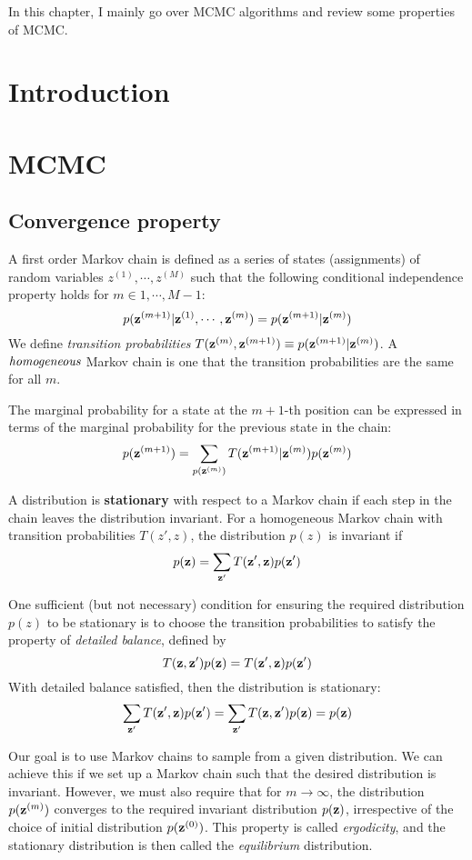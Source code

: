 In this chapter, I mainly go over MCMC algorithms and review some properties of MCMC.
\section{Introduction}
\section{MCMC}
\subsection{Convergence property}
A first order Markov chain is defined as a series of states (assignments) of random variables $z^{(1)},\cdots,z^{(M)}$ such that the following conditional independence property holds for $m \in {1,\cdots,M-1}$:
$$p({\bf z}^{(m+1)}|{\bf z}^{(1)}, \cdots, {\bf z}^{(m)})=p({\bf z}^{(m+1)}|{\bf z}^{(m)})$$
We define {\it transition probabilities} $T({\bf z}^{(m)},{\bf z}^{(m+1)})\equiv p({\bf z}^{(m+1)}|{\bf z}^{(m)})$. A ${\it homogeneous}$ Markov chain is one that
the transition probabilities are the same for all $m$.


The marginal probability for a state at the $m+1$-th position can be expressed in terms of the marginal probability for the previous state in the chain:
$$p({\bf z}^{(m+1)})=\sum_{p({\bf z}^{(m)})} T({\bf z}^{(m+1)}|{\bf z}^{(m)})p({\bf z}^{(m)})$$

A distribution is {\bf stationary} with respect to a Markov chain if each step in the chain leaves the distribution invariant. For a homogeneous Markov chain 
with transition probabilities $T(z',z)$, the distribution $p(z)$ is invariant if
$$p({\bf z}) = \sum_{{\bf z'}}T({\bf z'}, {\bf z})p({\bf z'})$$

One sufficient (but not necessary) condition for ensuring the required distribution $p(z)$ to be stationary is to choose the transition probabilities to satisfy the property
of {\it detailed balance}, defined by
$$T({\bf z}, {\bf z'})p({\bf z}) = T({\bf z'}, {\bf z})p({\bf z'})$$
With detailed balance satisfied, then the distribution is stationary:
$$\sum_{{\bf z'}}T({\bf z'}, {\bf z})p({\bf z'}) = \sum_{{\bf z'}}T({\bf z}, {\bf z'})p({\bf z}) = p({\bf z})$$

Our goal is to use Markov chains to sample from a given distribution. We can achieve this if we set up a Markov chain such that the desired distribution is invariant. However, we must also require that for $m \rightarrow \infty$, the distribution $p({\bf z}^{(m)})$ converges to the required invariant distribution $p({\bf z})$, irrespective of the choice of initial distribution $p({\bf z}^{(0)})$. This property is called {\it ergodicity}, and the stationary distribution is then called the {\it equilibrium} distribution.


